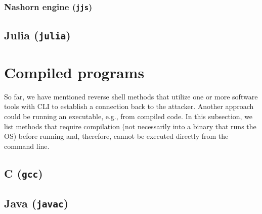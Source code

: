 


\subsubsection{Nashorn engine (\texttt{jjs})}





\subsection{Julia (\texttt{julia})}





\section{Compiled programs}

So far, we have mentioned reverse shell methods that utilize one or more software tools with CLI to establish a connection back to the attacker. Another approach could be running an executable, e.g., from compiled code. In this subsection, we list methods that require compilation (not necessarily into a binary that runs the OS) before running and, therefore, cannot be executed directly from the command line.

\subsection{C (\texttt{gcc})}



\subsection{Java (\texttt{javac})}

